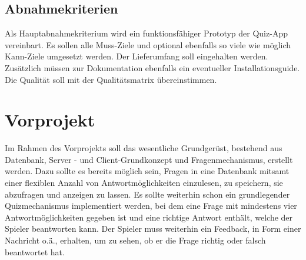 \documentclass[11pt,a4paper]{scrreprt}
\begin{document}
\section{Abnahmekriterien}
Als Hauptabnahmekriterium wird ein funktionsfähiger Prototyp der Quiz-App vereinbart. Es sollen alle Muss-Ziele und optional ebenfalls so viele wie möglich Kann-Ziele umgesetzt werden. Der Lieferumfang soll eingehalten werden. Zusätzlich müssen zur Dokumentation ebenfalls ein eventueller Installationsguide. Die Qualität soll mit der Qualitätsmatrix übereinstimmen.
	
\chapter{Vorprojekt}
Im Rahmen des Vorprojekts soll das wesentliche Grundgerüst, bestehend aus Datenbank, Server - und Client-Grundkonzept und Fragenmechanismus, erstellt werden. Dazu sollte es bereits möglich sein, Fragen in eine Datenbank mitsamt einer flexiblen Anzahl von Antwortmöglichkeiten einzulesen, zu speichern, sie abzufragen und anzeigen zu lassen. Es sollte weiterhin schon ein grundlegender Quizmechanismus implementiert werden, bei dem eine Frage mit mindestens vier Antwortmöglichkeiten gegeben ist und eine richtige Antwort enthält, welche der Spieler beantworten kann. Der Spieler muss weiterhin ein Feedback, in Form einer Nachricht o.ä., erhalten, um zu sehen, ob er die Frage richtig oder falsch beantwortet hat.
\end{document}
